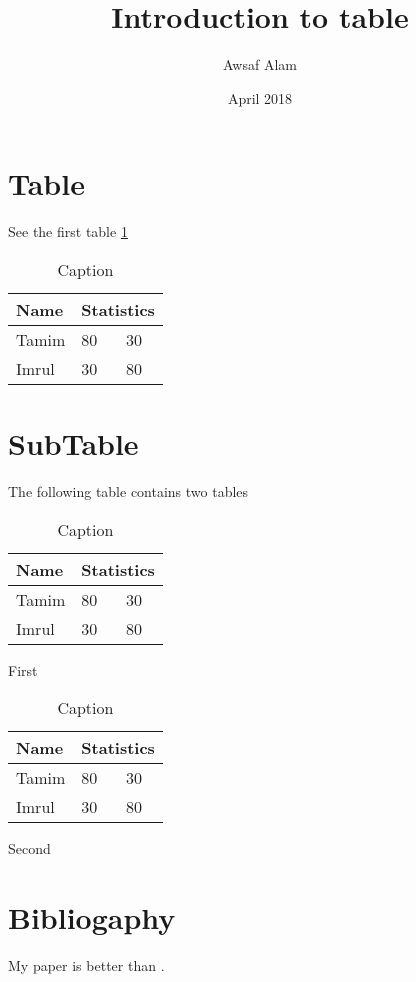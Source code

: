 \documentclass{article}
\title{Introduction to table}
\author{Awsaf Alam }
\date{April 2018}
\begin{document}
\maketitle

\listoftables

\section{Table}
See the first table \ref{tab:table}
\begin{table}[h!]
    \centering
    \begin{tabular}{|m{2cm}|m{2cm}|m{3cm}|}
    \hline
    Name &
    \multicolumn{2}{c|}{Statistics} \\
    \hline
    \hline
    Tamim & 80  & 30\\
    \hline
    Imrul & 30 & 80\\
    \hline

    \end{tabular}
    \caption{Caption}
    \label{tab:table}
\end{table}

\section{SubTable}

The following table contains two tables
\begin{table}[h!]
  \begin{subtable}{0.45\textwidth}
        \begin{tabular}{|m{2cm}|m{2cm}|m{3cm}|}
        \hline
            Name &
            \multicolumn{2}{c|}{Statistics} \\
            \hline
            \hline
            Tamim & 80  & 30\\
            \hline
            Imrul & 30 & 80\\
            \hline

        \end{tabular}
    \caption{First}
    \label{subtab:1}
    \end{subtable}


   \begin{subtable}{0.45\textwidth}
        \begin{tabular}{|m{2cm}|m{2cm}|m{3cm}|}
        \hline
            Name &
            \multicolumn{2}{c|}{Statistics} \\
            \hline
            \hline
            Tamim & 80  & 30\\
            \hline
            Imrul & 30 & 80\\
            \hline

        \end{tabular}
    \caption{Second}
    \label{subtab:2}

    \end{subtable}

    \caption{Caption}
\end{table}

\section{Bibliogaphy}
My paper is better than \cite{Aggarwal:2009}.







\printbibliography
\end{document}
